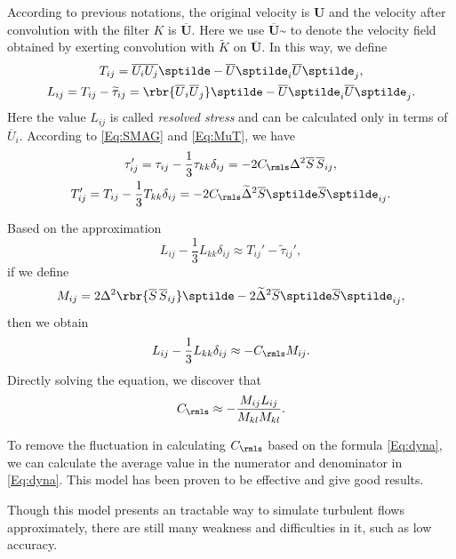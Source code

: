 \documentclass[english, nochinese]{pkupaper}
\begin{document}
According to previous notations, the original velocity is $\mathbf{U}$ and the velocity after convolution with the filter $K$ is $\overline{\mathbf{U}}$. Here we use $\overline{\mathbf{U}}\sptilde$ to denote the velocity field obtained by exerting convolution with $\widetilde{K}$ on $\overline{\mathbf{U}}$. In this way, we define
\begin{gather}
T_{ij} = \overline{U_iU_j}\sptilde - \overline{U}\sptilde_i \overline{U}\sptilde_j,\\
L_{ij} = T_{ij} - \widetilde{\tau}_{ij} = \rbr{\overline{U}_i\overline{U}_j}\sptilde - \overline{U}\sptilde_i\overline{U}\sptilde_j.
\end{gather}
Here the value $L_{ij}$ is called \emph{resolved stress} and can be calculated only in terms of $\overline{U}_i$. According to \eqref{Eq:SMAG} and \eqref{Eq:MuT}, we have 
\begin{gather}
\tau_{ij}' = \tau_{ij} - \frac{1}{3}\tau_{kk}\delta_{ij} = -2C_{\rmls}\Delta^2\overline{S}\,\overline{S}_{ij},\\
T_{ij}' = T_{ij} - \frac{1}{3}T_{kk}\delta_{ij} = -2C_{\rmls}\widetilde{\Delta}^2\overline{S}\sptilde\overline{S}\sptilde_{ij}.
\end{gather}

Based on the approximation
\begin{equation}
L_{ij} - \frac{1}{3} L_{kk}\delta_{ij}\approx T_{ij}' - \widetilde{\tau}_{ij}',
\end{equation}
if we define
\begin{equation}
M_{ij} = 2\Delta^2 \rbr{{\overline{S}}\,{\overline{S}_{ij}}}\sptilde - 2\widetilde{\Delta}^2\overline{S}\sptilde\overline{S}\sptilde_{ij},
\end{equation}
then we obtain
\begin{equation}
L_{ij} - \frac{1}{3}L_{kk}\delta_{ij} \approx -C_{\rmls} M_{ij}.
\end{equation}
Directly solving the equation, we discover that
\begin{equation}\label{Eq:dyna}
C_{\rmls} \approx -\frac{M_{ij} L_{ij}}{M_{kl}M_{kl}}.
\end{equation}

To remove the fluctuation in calculating $C_{\rmls}$ based on the formula \eqref{Eq:dyna}, we can calculate the average value in the numerator and denominator in \eqref{Eq:dyna}. This model has been proven to be effective and give good results.

Though this model presents an tractable way to simulate turbulent flows approximately, there are still many weakness and difficulties in it, such as low accuracy.
\end{document}
